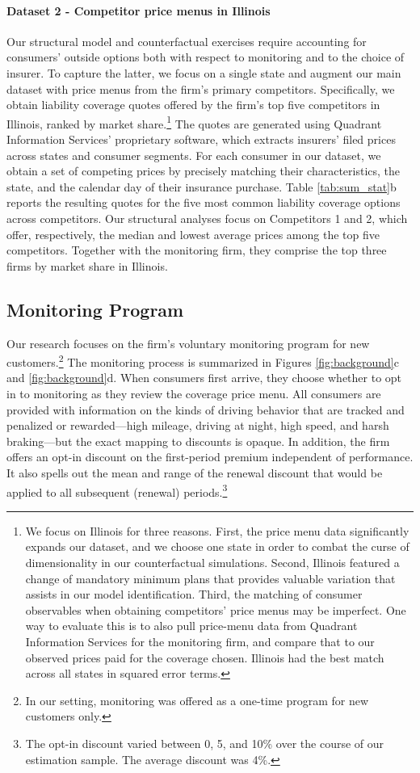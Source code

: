 \paragraph{Dataset 2 - Competitor price menus in Illinois}
Our structural model and counterfactual exercises require accounting for consumers' outside options both with respect to monitoring and to the choice of insurer.
To capture the latter, we focus on a single state and augment our main dataset with price menus from the firm's primary competitors. Specifically, we obtain liability coverage quotes offered by the firm's top five competitors in Illinois, ranked by market share.\footnote{We focus on Illinois for three reasons. First, the price menu data significantly expands our dataset, and we choose one state in order to combat the curse of dimensionality in our counterfactual simulations. Second, Illinois featured a change of mandatory minimum plans that provides valuable variation that assists in our model identification. Third, the matching of consumer observables when obtaining competitors' price menus may be imperfect. One way to evaluate this is to also pull price-menu data from Quadrant Information Services for the monitoring firm, and compare that to our observed prices paid for the coverage chosen. Illinois had the best match across all states in squared error terms.}
The quotes are generated using Quadrant Information Services' proprietary software, which extracts insurers' filed prices across states and consumer segments.
For each consumer in our dataset, we obtain a set of competing prices by precisely matching their characteristics, the state, and the calendar day of their insurance purchase.
Table \ref{tab:sum_stat}b reports the resulting quotes for the five most common liability coverage options across competitors. Our structural analyses focus on Competitors 1 and 2, which offer, respectively, the median and lowest average prices among the top five competitors. Together with the monitoring firm, they comprise the top three firms by market share in Illinois.

\subsection{Monitoring Program\label{subsec:data_monitoring}}

Our research focuses on the firm's voluntary monitoring program for new customers.\footnote{In our setting, monitoring was offered as a one-time program for new customers only.} The monitoring process is summarized in Figures \ref{fig:background}c and \ref{fig:background}d. When consumers first arrive, they choose whether to opt in to monitoring as they review the coverage price menu. All consumers are provided with information on the kinds of driving behavior that are tracked and penalized or rewarded---high mileage, driving at night, high speed, and harsh braking---but the exact mapping to discounts is opaque. In addition, the firm offers an opt-in discount on the first-period premium independent of performance. It also spells out the mean and range of the renewal discount that would be applied to all subsequent (renewal) periods.\footnote{The opt-in discount varied between 0, 5, and 10\% over the course of our estimation sample. The average discount was 4\%.
}

